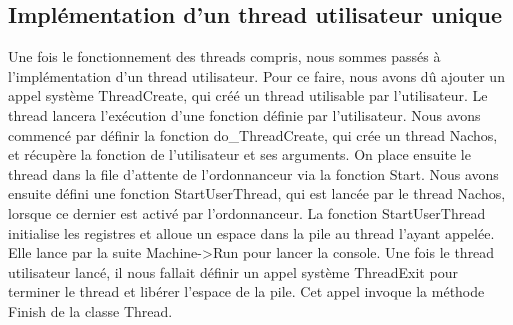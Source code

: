 \documentclass[10pt]{article}
\begin{document}
\subsection{Implémentation d'un thread utilisateur unique}
Une fois le fonctionnement des threads compris, nous sommes passés à l'implémentation d'un thread utilisateur.
Pour ce faire, nous avons dû ajouter un appel système \textcolor{blue2}{ThreadCreate}, qui créé un thread utilisable par l'utilisateur. Le thread lancera l'exécution d'une fonction définie par l'utilisateur.
\newline
Nous avons commencé par définir la fonction \textcolor{red2}{do\_ThreadCreate}, qui crée un thread Nachos, et récupère la fonction de l'utilisateur et ses arguments. On place ensuite le thread dans la file d'attente de l'ordonnanceur via la fonction \textcolor{red2}{Start}.
Nous avons ensuite défini une fonction \textcolor{red2}{StartUserThread}, qui est lancée par le thread Nachos, lorsque ce dernier est activé par l'ordonnanceur.
La fonction \textcolor{red2}{StartUserThread} initialise les registres et alloue un espace dans la pile au thread l'ayant appelée. Elle lance par la suite \textcolor{red2}{Machine->Run} pour lancer la console.
Une fois le thread utilisateur lancé, il nous fallait définir un appel système \textcolor{blue2}{ThreadExit} pour terminer le thread et libérer l'espace de la pile.
Cet appel invoque la méthode \textcolor{red2}{Finish} de la classe Thread.
\newpage
\end{document}

